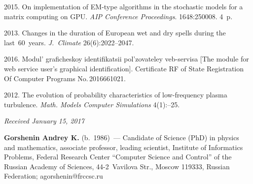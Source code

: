 \begin{multicols}{2}
{{\begin{thebibliography}{99}
 2015. On implementation of EM-type algorithms in the 
stochastic models for a matrix computing on GPU. \textit{AIP Conference Proceedings}.
 1648:250008. 4~p.

2013. Changes in the duration of European wet and dry spells during the last~60~years. 
\textit{J.~Climate} 26(6):2022--2047.

 2016. Modul' graficheskoy 
identifikatsii pol'zovateley veb-servisa [The module for web service user's 
graphical identification]. Certificate RF of State Registration Of Computer 
Programs No.\,2016661021.

 2012. 
The evolution of probability characteristics of low-frequency plasma turbulence. 
\textit{Math. Models Computer Simulations} 4(1):--25.
\end{thebibliography}

 }
 }

\end{multicols}

\vspace*{-3pt}

\hfill{\small\textit{Received January 15, 2017}}



\Contrl

\noindent
\textbf{Gorshenin Andrey K.} (b.\ 1986)~--- 
Candidate of Science (PhD) in physics and mathematics, associate professor,
leading scientist,
Institute of Informatics Problems,
Federal Research Center ``Computer Science and Control'' 
of the Russian Academy of Sciences, 44-2~Vavilova Str., Moscow 119333, 
Russian Federation; \mbox{agorshenin@frccsc.ru}


\label{end\stat}


\renewcommand{\bibname}{\protect\rm Литература} 